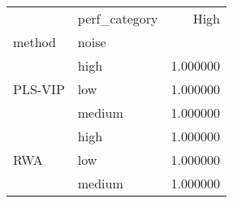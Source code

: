 \begin{tabular}{llr}
\toprule
 & perf_category & High \\
method & noise &  \\
\midrule
\multirow[t]{3}{*}{PLS-VIP} & high & 1.000000 \\
 & low & 1.000000 \\
 & medium & 1.000000 \\
\cline{1-3}
\multirow[t]{3}{*}{RWA} & high & 1.000000 \\
 & low & 1.000000 \\
 & medium & 1.000000 \\
\cline{1-3}
\bottomrule
\end{tabular}
